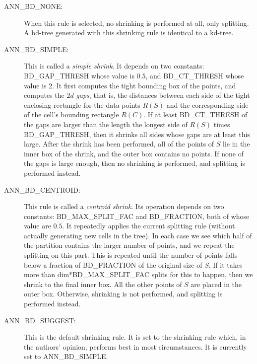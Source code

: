\documentclass[11pt]{article}		%
\begin{document}
\begin{description}
\item[\hbox{\sf ANN\_BD\_NONE:}] When this rule is selected, no shrinking is
	performed at all, only splitting.  A bd-tree generated with this
	shrinking rule is identical to a kd-tree.

\item[\hbox{\sf ANN\_BD\_SIMPLE:}]
	This is called a \emph{simple shrink}.  It depends on two constants:
	\textsf{BD\_GAP\_THRESH} whose value is $0.5$,  and
	\textsf{BD\_CT\_THRESH} whose value is 2.  It first computes the
	tight bounding box of the points, and computes the $2d$ \emph{gaps},
	that is, the distances between each side of the tight enclosing
	rectangle for the data points $R(S)$ and the corresponding side of
	the cell's bounding rectangle $R(C)$.  If at least
	\textsf{BD\_CT\_THRESH} of the gaps are larger than the length the
	longest side of $R(S)$ times \textsf{BD\_GAP\_THRESH}, then it
	shrinks all sides whose gaps are at least this large.  After the
	shrink has been performed, all of the points of $S$ lie in the inner
	box of the shrink, and the outer box contains no points.  If none of
	the gaps is large enough, then no shrinking is performed, and
	splitting is performed instead.

\item[\hbox{\sf ANN\_BD\_CENTROID:}]

	This rule is called a \emph{centroid shrink}.  Its operation depends
	on two constants: \textsf{BD\_MAX\_SPLIT\_FAC} and
	\textsf{BD\_FRACTION}, both of whose value are $0.5$.  It repeatedly
	applies the current splitting rule (without actually generating new
	cells in the tree).  In each case we see which half of the partition
	contains the larger number of points, and we repeat the splitting on
	this part.  This is repeated until the number of points falls below
	a fraction of \textsf{BD\_FRACTION} of the original size of $S$.  If
	it takes more than \textsf{dim*BD\_MAX\_SPLIT\_FAC} splits for this
	to happen, then we shrink to the final inner box.  All the other
	points of $S$ are placed in the outer box.  Otherwise, shrinking is
	not performed, and splitting is performed instead.

\item[\hbox{\sf ANN\_BD\_SUGGEST:}]
	This is the default shrinking rule.  It is set to the shrinking rule
	which, in the authors' opinion, performs best in most circumstances.
	It is currently set to \textsf{ANN\_BD\_SIMPLE}.
\end{description}
\end{document}
